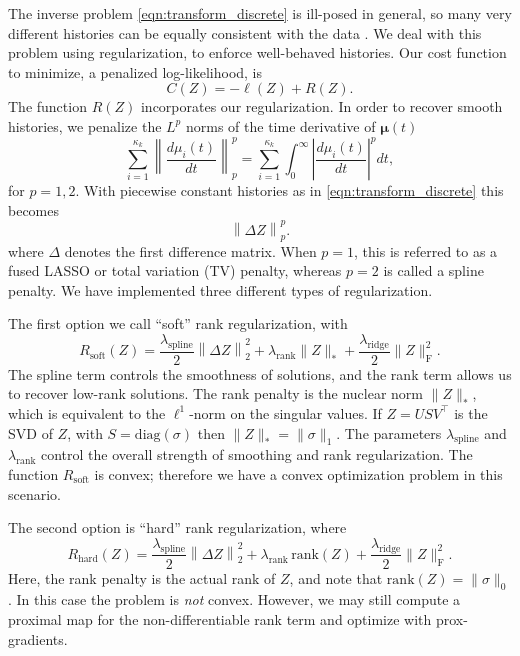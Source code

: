 \documentclass[11pt]{article}
\begin{document}
The inverse problem \eqref{eqn:transform_discrete} is ill-posed in general,
so many very different histories can be equally consistent with the data
\cite{oscillation paper? Yun's other papers?}.
We deal with this problem using regularization, to enforce well-behaved histories.
Our cost function to minimize, a penalized log-likelihood, is
\begin{equation}
\label{eqn:penalized}
C(Z)
= -\ell(Z) + R(Z) .
\end{equation}
The function $R(Z)$ incorporates our regularization.
In order to recover smooth histories,
we penalize the $L^p$ norms
of the time derivative of $\boldsymbol\mu(t)$
\[
\sum_{i=1}^{\kappa_k}\left\| \frac{d \mu_i(t)}{d t} \right\|_p^p
= \sum_{i=1}^{\kappa_k}\int_0^\infty\left|\frac{d\mu_i(t)}{dt}\right|^p dt,
\]
for $p=1,2$.
With piecewise constant histories as in \eqref{eqn:transform_discrete} this becomes
\[
\left\|\Delta Z \right\|_p^p.
\]
where $\Delta$ denotes the first difference matrix.
When $p = 1$, this is referred to as a fused LASSO or total variation (TV) penalty,
whereas $p=2$ is called a spline penalty.
We have implemented three different types of regularization.

The first option we call ``soft'' rank regularization, with
\begin{equation}
  \label{eq:regularization_soft}
  R_\mathrm{soft}(Z)
  =
  \frac{  \lambda_\mathrm{spline} }{2} \left\|\Delta Z\right\|_2^2
  +
  \lambda_\mathrm{rank} \| Z \|_*
  +
   \frac{\lambda_\mathrm{ridge}}{2}  \| Z \|_\mathrm{F}^2
   .
\end{equation}
The spline term controls the smoothness of solutions,
and the rank term allows us to recover low-rank solutions.
The rank penalty is the nuclear norm $\| Z \|_*$,
which is equivalent to the $\ell^1$-norm on the singular values.
If $Z = U S V^\intercal$ is the SVD of $Z$, with $S = \mathrm{diag}(\sigma)$ then $\| Z \|_* = \| \sigma \|_1$.
The parameters $\lambda_\mathrm{spline}$ and $\lambda_\mathrm{rank}$ control the overall strength
of smoothing and rank regularization.
The function $R_\mathrm{soft}$ is convex; therefore we have a convex optimization problem
in this scenario.

The second option is ``hard'' rank regularization, where
\begin{equation}
  \label{eq:regularization_soft}
  R_\mathrm{hard}(Z)
  =
  \frac{\lambda_\mathrm{spline}}{2} \left\|\Delta Z\right\|_2^2
  +
  \lambda_\mathrm{rank} \, \mathrm{rank}(Z)
  +
  \frac{\lambda_\mathrm{ridge}}{2} \| Z \|_\mathrm{F}^2
  .
\end{equation}
Here, the rank penalty is the actual rank of $Z$,
and note that $\mathrm{rank}(Z) = \| \sigma \|_0$.
In this case the problem is {\em not} convex.
However, we may still compute a proximal map for the non-differentiable rank term
and optimize with prox-gradients.
\end{document}
